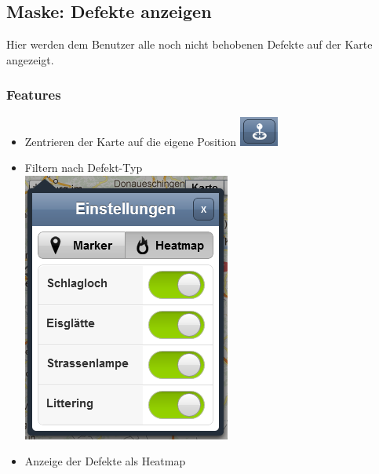 \subsection{Maske: Defekte anzeigen}
Hier werden dem Benutzer alle noch nicht behobenen Defekte auf der Karte angezeigt.

\subsubsection{Features}
\begin{itemize}
\item Zentrieren der Karte auf die eigene Position \includegraphics[scale=0.8]{images/usecase2-fixmystreet/features/features-report-center_map_button}
\item Filtern nach Defekt-Typ \\ \includegraphics[scale=0.8]{images/usecase2-fixmystreet/features/features-map-settings}
\item Anzeige der Defekte als Heatmap
\end{itemize}

